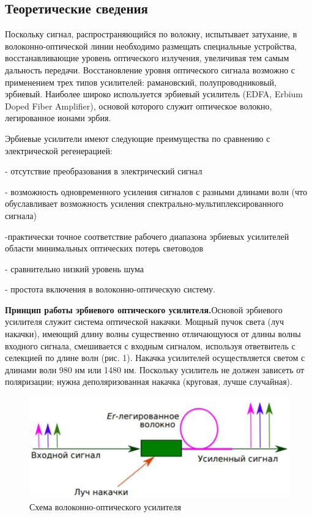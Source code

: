 \documentclass[12pt,a4paper]{article}
\begin{document}
\subsection{Теоретические сведения}
Поскольку сигнал, распространяющийся по волокну, испытывает
затухание, в волоконно-оптической линии необходимо размещать
специальные устройства, восстанавливающие уровень оптического
излучения, увеличивая тем самым дальность передачи. Восстановление уровня оптического сигнала возможно с применением трех типов усилителей: рамановский, полупроводниковый, эрбиевый. Наиболее широко используется эрбиевый усилитель (EDFA, Erbium Doped Fiber Amplifier), основой которого служит оптическое волокно, легированное ионами эрбия. 

Эрбиевые усилители имеют следующие преимущества по сравнению
с электрической регенерацией:

- отсутствие преобразования в электрический сигнал

- возможность одновременного усиления сигналов с
разными длинами волн (что обуславливает возможность усиления
спектрально-мультиплексированного сигнала)

-практически точное соответствие рабочего диапазона эрбиевых усилителей области минимальных оптических потерь световодов 

- сравнительно низкий уровень шума 

- простота включения в волоконно-оптическую систему.

\textbf{Принцип работы эрбиевого оптического усилителя.}Основой эрбиевого усилителя служит система оптической накачки.
Мощный пучок света (луч накачки), имеющий длину волны существенно
отличающуюся от длины волны входного сигнала, смешивается с
входным сигналом, используя ответвитель с селекцией по длине волн
(рис. 1). Накачка усилителей осуществляется
светом с длинами волн 980 нм или 1480 нм. Поскольку усилитель не
должен зависеть от поляризации; нужна деполяризованная накачка
(круговая, лучше случайная).
\begin{figure}[h!]
		\centering
		\includegraphics[width=0.60\linewidth]{erb_1.jpg}
		\caption{Схема волоконно-оптического усилителя}
		\label{labC}
	\end{figure}
	
\end{document}
